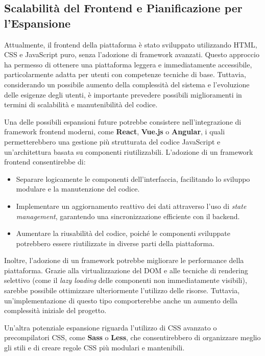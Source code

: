 \subsection{Scalabilità del Frontend e Pianificazione per l’Espansione}
\label{sec:scalabilita_frontend}

Attualmente, il frontend della piattaforma è stato sviluppato utilizzando HTML, CSS e JavaScript puro, senza l’adozione di framework avanzati. Questo approccio ha permesso di ottenere una piattaforma leggera e immediatamente accessibile, particolarmente adatta per utenti con competenze tecniche di base. Tuttavia, considerando un possibile aumento della complessità del sistema e l’evoluzione delle esigenze degli utenti, è importante prevedere possibili miglioramenti in termini di scalabilità e manutenibilità del codice.

Una delle possibili espansioni future potrebbe consistere nell'integrazione di framework frontend moderni, come \textbf{React}, \textbf{Vue.js} o \textbf{Angular}, i quali permetterebbero una gestione più strutturata del codice JavaScript e un’architettura basata su componenti riutilizzabili. L’adozione di un framework frontend consentirebbe di:

\begin{itemize}
    \item Separare logicamente le componenti dell’interfaccia, facilitando lo sviluppo modulare e la manutenzione del codice.
    \item Implementare un aggiornamento reattivo dei dati attraverso l’uso di \textit{state management}, garantendo una sincronizzazione efficiente con il backend.
    \item Aumentare la riusabilità del codice, poiché le componenti sviluppate potrebbero essere riutilizzate in diverse parti della piattaforma.
\end{itemize}


Inoltre, l'adozione di un framework potrebbe migliorare le performance della piattaforma. Grazie alla virtualizzazione del DOM e alle tecniche di rendering selettivo (come il \textit{lazy loading} delle componenti non immediatamente visibili), sarebbe possibile ottimizzare ulteriormente l'utilizzo delle risorse. Tuttavia, un'implementazione di questo tipo comporterebbe anche un aumento della complessità iniziale del progetto.

Un’altra potenziale espansione riguarda l’utilizzo di CSS avanzato o precompilatori CSS, come \textbf{Sass} o \textbf{Less}, che consentirebbero di organizzare meglio gli stili e di creare regole CSS più modulari e mantenibili.

